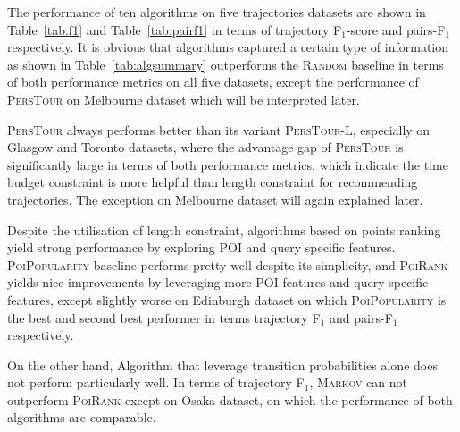 The performance of ten algorithms on five trajectories datasets are shown in Table~\ref{tab:f1}
and Table~\ref{tab:pairf1} in terms of trajectory F$_1$-score and pairs-F$_1$ respectively.
%
It is obvious that algorithms captured a certain type of information as shown in Table~\ref{tab:algsummary}
outperforms the \textsc{Random} baseline in terms of both performance metrics on all five datasets,
except the performance of \textsc{PersTour}\cite{ijcai15} on Melbourne dataset which will be interpreted later.

\textsc{PersTour}\cite{ijcai15} always performs better than its variant \textsc{PersTour-L},
especially on Glasgow and Toronto datasets, where the advantage gap of \textsc{PersTour}
is significantly large in terms of both performance metrics,
%
which indicate the time budget constraint is more helpful than length constraint for recommending trajectories.
The exception on Melbourne dataset will again explained later.

Despite the utilisation of length constraint, algorithms based on points ranking yield strong performance
by exploring POI and query specific features.
%
\textsc{PoiPopularity} baseline performs pretty well despite its simplicity,
and \textsc{PoiRank} yields nice improvements by leveraging more POI features and query specific features,
except slightly worse on Edinburgh dataset on which \textsc{PoiPopularity} is the best and
second best performer in terms trajectory F$_1$ and pairs-F$_1$ respectively.

On the other hand, Algorithm that leverage transition probabilities alone does not perform particularly well.
%
In terms of trajectory F$_1$,
\textsc{Markov} can not outperform \textsc{PoiRank} except on Osaka dataset,
on which the performance of both algorithms are comparable.

